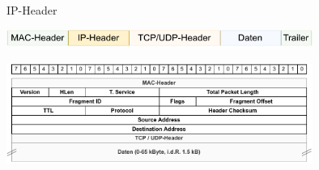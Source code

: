 \begin{defi}{IP-Header}
    \begin{center}
        \includegraphics[width=0.75\textwidth]{includes/figures/defi_ip_header_kapselung.pdf}
        
        \includegraphics[width=0.75\textwidth]{includes/figures/defi_ip_header.pdf}
    \end{center}
\end{defi}